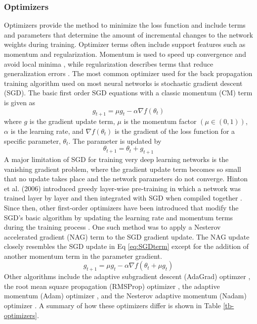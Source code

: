 \subsubsection{Optimizers}
Optimizers provide the method to minimize the loss function and include terms and parameters that determine the amount of incremental changes to the network weights during training. Optimizer terms often include support features such as momentum and regularization. Momentum is used to speed up convergence and avoid local minima \citep{Sutskever2013}, while regularization describes terms that reduce generalization errors \citep{Goodfellow2016}. The most common optimizer used for the back propagation training algorithm used on most neural networks is stochastic gradient descent (SGD). The basic first order SGD equations with a classic momentum (CM) term is given as
%
\begin{equation}
\label{eq:SGDterm}
g_{t+1} = \mu g_{t} - \alpha \nabla f (\theta_{t})
\end{equation}
%
\noindent
where $g$ is the gradient update term, $\mu$ is the momentum factor $(\mu \in (0,1))$, $\alpha$ is the learning rate, and $\nabla f (\theta_{t})$ is the gradient of the loss function for a specific parameter, $\theta_{t}$. The parameter is updated by
%
\begin{equation}
\label{eq:SGDupdate}
\theta_{t+1} = \theta_{t} + g_{t+1}
\end{equation}
%
A major limitation of SGD for training very deep learning networks is the vanishing gradient problem, where the gradient update term becomes so small that no update takes place and the network parameters do not converge. Hinton et al. (2006) introduced greedy layer-wise pre-training in which a network was trained layer by layer and then integrated with SGD when compiled together \citep{Hinton2006}. Since then, other first-order optimizers have been introduced that modify the SGD's basic algorithm by updating the learning rate and momentum terms during the training process \citep{Sutskever2013}.  One such method was to apply a Nesterov accelerated gradient (NAG) \citep{Nesterov1983} term to the SGD gradient update. The NAG update closely resembles the SGD update in Eq \ref{eq:SGDterm} except for the addition of another momentum term in the parameter gradient.
%
\begin{equation}
\label{eq:SGD-NAG}
g_{t+1} = \mu g_{t} - \alpha \nabla f (\theta_{t} + \mu g_{t})
\end{equation}
%
Other algorithms include the adaptive subgradient descent (AdaGrad) optimzer \citep{Duchi2011}, the root mean square propagation (RMSProp) optimizer \citep{Tieleman2012}, the adaptive momentum (Adam) optimizer \citep{Kingma2014}, and the Nesterov adaptive momentum (Nadam) optimizer \citep{Dozat2016}. A summary of how these optimizers differ is shown in Table \ref{tb-optimizers}.
